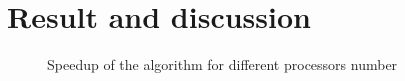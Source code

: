 \chapter{Result and discussion}

\begin{figure}[h]
  \begin{center}
  \end{center}
  \caption{Speedup of the algorithm for different processors number}
  \label{fig:graph}
\end{figure}
